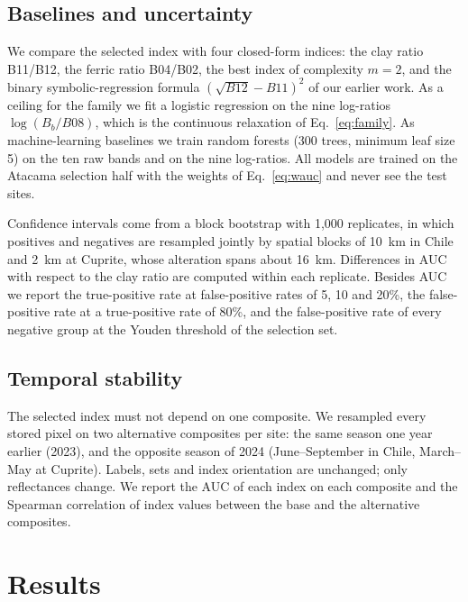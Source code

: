 \documentclass[preprint,authoryear,number]{elsarticle}
\begin{document}
\subsection{Baselines and uncertainty}
\label{sec:baselines}

We compare the selected index with four closed-form indices: the clay ratio B11/B12, the ferric ratio B04/B02, the best index of complexity $m = 2$, and the binary symbolic-regression formula $(\sqrt{B12} - B11)^2$ of our earlier work. As a ceiling for the family we fit a logistic regression on the nine log-ratios $\log(B_b/B08)$, which is the continuous relaxation of Eq.~\ref{eq:family}. As machine-learning baselines we train random forests (300 trees, minimum leaf size 5) on the ten raw bands and on the nine log-ratios. All models are trained on the Atacama selection half with the weights of Eq.~\ref{eq:wauc} and never see the test sites.

Confidence intervals come from a block bootstrap with 1{,}000 replicates, in which positives and negatives are resampled jointly by spatial blocks of \SI{10}{\kilo\meter} in Chile and \SI{2}{\kilo\meter} at Cuprite, whose alteration spans about \SI{16}{\kilo\meter}. Differences in AUC with respect to the clay ratio are computed within each replicate. Besides AUC we report the true-positive rate at false-positive rates of 5, 10 and 20\%, the false-positive rate at a true-positive rate of 80\%, and the false-positive rate of every negative group at the Youden threshold of the selection set.

\subsection{Temporal stability}
\label{sec:temporal}

The selected index must not depend on one composite. We resampled every stored pixel on two alternative composites per site: the same season one year earlier (2023), and the opposite season of 2024 (June--September in Chile, March--May at Cuprite). Labels, sets and index orientation are unchanged; only reflectances change. We report the AUC of each index on each composite and the Spearman correlation of index values between the base and the alternative composites.

\section{Results}
\label{sec:results}
\end{document}
